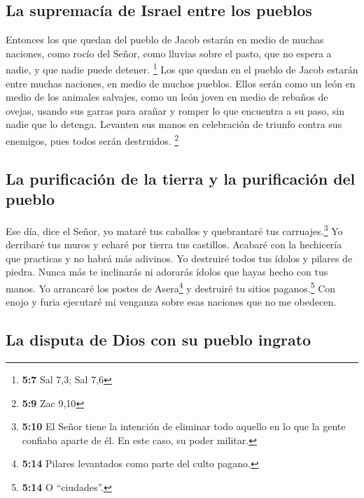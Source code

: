 \hypertarget{la-supremacuxeda-de-israel-entre-los-pueblos}{%
\subsection{La supremacía de Israel entre los
pueblos}\label{la-supremacuxeda-de-israel-entre-los-pueblos}}

 Entonces los que quedan del pueblo de Jacob estarán en
medio de muchas naciones, como rocío del Señor, como lluvias sobre el
pasto, que no espera a nadie, y que nadie puede detener. \footnote{\textbf{5:7}
  Sal 7,3; Sal 7,6}  Los que quedan en el pueblo de Jacob
estarán entre muchas naciones, en medio de muchos pueblos. Ellos serán
como un león en medio de los animales salvajes, como un león joven en
medio de rebaños de ovejas, usando sus garras para arañar y romper lo
que encuentra a su paso, sin nadie que lo detenga. 
Levanten sus manos en celebración de triunfo contra sus enemigos, pues
todos serán destruidos. \footnote{\textbf{5:9} Zac 9,10}

\hypertarget{la-purificaciuxf3n-de-la-tierra-y-la-purificaciuxf3n-del-pueblo}{%
\subsection{La purificación de la tierra y la purificación del
pueblo}\label{la-purificaciuxf3n-de-la-tierra-y-la-purificaciuxf3n-del-pueblo}}

 Ese día, dice el Señor, yo mataré tus caballos y
quebrantaré tus carruajes.\footnote{\textbf{5:10} El Señor tiene la
  intención de eliminar todo aquello en lo que la gente confiaba aparte
  de él. En este caso, su poder militar.}  Yo derribaré
tus muros y echaré por tierra tus castillos.  Acabaré con
la hechicería que practicas y no habrá más adivinos.  Yo
destruiré todos tus ídolos y pilares de piedra. Nunca más te inclinarás
ni adorarás ídolos que hayas hecho con tus manos.  Yo
arrancaré los postes de Asera\footnote{\textbf{5:14} Pilares levantados
  como parte del culto pagano.} y destruiré tu sitios
paganos.\footnote{\textbf{5:14} O ``ciudades''.}  Con
enojo y furia ejecutaré mi venganza sobre esas naciones que no me
obedecen.

\hypertarget{la-disputa-de-dios-con-su-pueblo-ingrato}{%
\subsection{La disputa de Dios con su pueblo
ingrato}\label{la-disputa-de-dios-con-su-pueblo-ingrato}}

